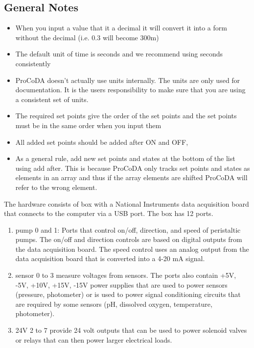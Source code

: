 \documentclass[letterpaper,10pt,english]{sphinxmanual}
\begin{document}
\subsection{General Notes}
\label{\detokenize{ProCoDA/ProCoDA:general-notes}}\begin{itemize}
\item {} 
When you input a value that it a decimal it will convert it into a form without the decimal (i.e. 0.3 will become 300m)

\item {} 
The default unit of time is seconds and we recommend using seconds consistently

\item {} 
ProCoDA doesn’t actually use units internally. The units are only used for documentation. It is the users responsibility to make sure that you are using a consistent set of units.

\item {} 
The required set points give the order of the set points and the set points must be in the same order when you input them

\item {} 
All added set points should be added after ON and OFF,

\item {} 
As a general rule, add new set points and states at the bottom of the list using add after. This is because ProCoDA only tracks set points and states as elements in an array and thus if the array elements are shifted ProCoDA will refer to the wrong element.

\end{itemize}

The hardware consists of box with a National Instruments data acquisition board that connects to the computer via a USB port. The box has 12 ports.
\begin{enumerate}
\item {} 
pump 0 and 1: Ports that control on/off, direction, and speed of peristaltic pumps. The on/off and direction controls are based on digital outputs from the data acquisition board. The speed control uses an analog output from the data acquisition board that is converted into a 4-20 mA signal.

\item {} 
sensor 0 to 3 measure voltages from sensors. The ports also contain +5V, -5V, +10V, +15V, -15V power supplies that are used to power sensors (pressure, photometer) or is used to power signal conditioning circuits that are required by some sensors (pH, dissolved oxygen, temperature, photometer).

\item {} 
24V 2 to 7 provide 24 volt outputs that can be used to power solenoid valves or relays that can then power larger electrical loads.

\end{enumerate}
\end{document}
